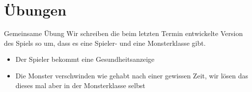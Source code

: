 \documentclass[presentation]{beamer}
\begin{document}
\section{Übungen}
\label{sec:org4057eb3}
\begin{frame}[label={sec:orgba4973f}]{Gemeinsame Übung}
Wir schreiben die beim letzten Termin entwickelte Version des Spiels
so um, dass es eine \alert{Spieler- und eine Monsterklasse} gibt.
\begin{itemize}
\item Der Spieler bekommt eine Gesundheitsanzeige
\item Die Monster verschwinden wie gehabt nach einer gewissen Zeit, wir
lösen das dieses mal aber in der Monsterklasse selbst
\end{itemize}
\end{frame}
\end{document}
